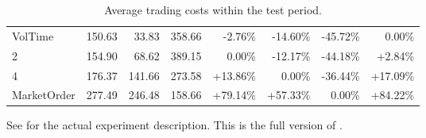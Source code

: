 \begin{table}[ht]
{\begin{tabular}{lRRR|RRRR}
\midrule
VolTime                      &    150.63 &   33.83 &  358.66 &   -2.76\% &  -14.60\% &  -45.72\% &        0.00\% \\
2                            &    154.90 &   68.62 &  389.15 &    0.00\% &  -12.17\% &  -44.18\% &        +2.84\% \\
4                            &    176.37 &  141.66 &  273.58 &   +13.86\% &    0.00\% &  -36.44\% &       +17.09\% \\
MarketOrder                  &    277.49 &  246.48 &  158.66 &   +79.14\% &   +57.33\% &    0.00\% &       +84.22\% \\
\bottomrule
\end{tabular}
}

        		\caption[Full version of ]{Average trading costs within the test period.}
		See  for the actual experiment description. This is the full version of .
		\label{tab:eval:additionalMarketVariables:fixed:fulltable}
\end{table}
\clearpage{}




















